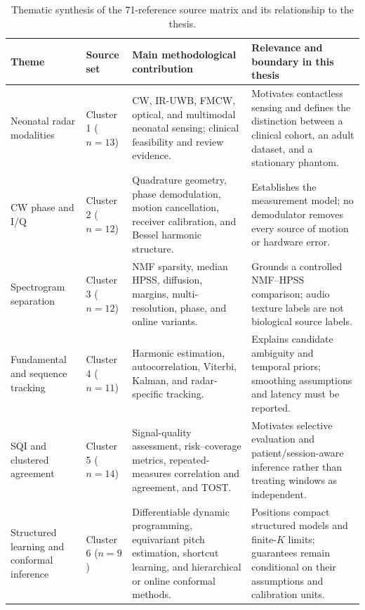 \begin{table}[htbp]
  \centering
  \footnotesize
  \caption{Thematic synthesis of the 71-reference source matrix and its relationship to the thesis.}
  \label{tab:ch2_literature_synthesis}
  \begin{tabularx}{\textwidth}{@{}>{\raggedright\arraybackslash}p{2.55cm}>{\raggedright\arraybackslash}p{2.15cm}>{\raggedright\arraybackslash}X >{\raggedright\arraybackslash}X@{}}
    \toprule
    Theme & Source set & Main methodological contribution & Relevance and boundary in this thesis \\
    \midrule
    Neonatal radar modalities & Cluster 1 ($n=13$) & CW, IR-UWB, FMCW, optical, and multimodal neonatal sensing; clinical feasibility and review evidence. & Motivates contactless sensing and defines the distinction between a clinical cohort, an adult dataset, and a stationary phantom. \\
    CW phase and I/Q & Cluster 2 ($n=12$) & Quadrature geometry, phase demodulation, motion cancellation, receiver calibration, and Bessel harmonic structure. & Establishes the measurement model; no demodulator removes every source of motion or hardware error. \\
    Spectrogram separation & Cluster 3 ($n=12$) & NMF sparsity, median HPSS, diffusion, margins, multi-resolution, phase, and online variants. & Grounds a controlled NMF--HPSS comparison; audio texture labels are not biological source labels. \\
    Fundamental and sequence tracking & Cluster 4 ($n=11$) & Harmonic estimation, autocorrelation, Viterbi, Kalman, and radar-specific tracking. & Explains candidate ambiguity and temporal priors; smoothing assumptions and latency must be reported. \\
    SQI and clustered agreement & Cluster 5 ($n=14$) & Signal-quality assessment, risk--coverage metrics, repeated-measures correlation and agreement, and TOST. & Motivates selective evaluation and patient/session-aware inference rather than treating windows as independent. \\
    Structured learning and conformal inference & Cluster 6 ($n=9$) & Differentiable dynamic programming, equivariant pitch estimation, shortcut learning, and hierarchical or online conformal methods. & Positions compact structured models and finite-$K$ limits; guarantees remain conditional on their assumptions and calibration units. \\
    \bottomrule
  \end{tabularx}
\end{table}

